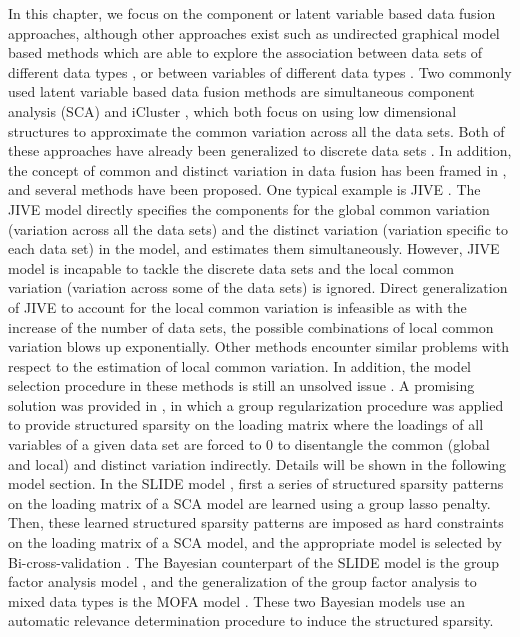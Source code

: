 In this chapter, we focus on the component or latent variable based data fusion approaches, although other approaches exist such as undirected graphical model based methods which are able to explore the association between data sets of different data types \cite{aben2018itop}, or between variables of different data types \cite{lee2015learning,cheng2017high}. Two commonly used latent variable based data fusion methods are simultaneous component analysis (SCA) \cite{van2009structured} and iCluster \cite{shen2009integrative}, which both focus on using low dimensional structures to approximate the common variation across all the data sets. Both of these approaches have already been generalized to discrete data sets \cite{mo2013pattern,song2018generalized}. In addition, the concept of common and distinct variation in data fusion has been framed in \cite{van2016separating,smilde2017common}, and several methods \cite{lock2013joint,lofstedt2013global,schouteden2014performing,maage2012preference,smilde2017common} have been proposed. One typical example is JIVE \cite{lock2013joint}. The JIVE model directly specifies the components for the global common variation (variation across all the data sets) and the distinct variation (variation specific to each data set) in the model, and estimates them simultaneously. However, JIVE model is incapable to tackle the discrete data sets and the local common variation (variation across some of the data sets) is ignored. Direct generalization of JIVE to account for the local common variation is infeasible as with the increase of the number of data sets, the possible combinations of local common variation blows up exponentially. Other methods \cite{schouteden2014performing,lofstedt2013global} encounter similar problems with respect to the estimation of local common variation. In addition, the model selection procedure in these methods is still an unsolved issue \cite{maage2018performance}. A promising solution was provided in \cite{klami2015group,gaynanova2017structural}, in which a group regularization procedure was applied to provide structured sparsity on the loading matrix where the loadings of all variables of a given data set are forced to 0 to disentangle the common (global and local) and distinct variation indirectly. Details will be shown in the following model section. In the SLIDE model \cite{gaynanova2017structural}, first a series of structured sparsity patterns on the loading matrix of a SCA model are learned using a group lasso penalty. Then, these learned structured sparsity patterns are imposed as hard constraints on the loading matrix of a SCA model, and the appropriate model is selected by Bi-cross-validation \cite{perry2009cross}. The Bayesian counterpart of the SLIDE model is the group factor analysis model \cite{klami2015group}, and the generalization of the group factor analysis to mixed data types is the MOFA model \cite{argelaguet2018multi}. These two Bayesian models use an automatic relevance determination procedure to induce the structured sparsity.

